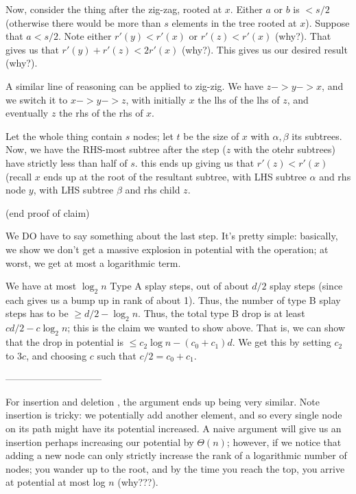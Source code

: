 \documentclass{article}
\begin{document}
Now, consider the thing after the zig-zag, rooted at $x$.
Either $a$ or $b$ is $< s/2$ (otherwise there would be more than $s$
elements in the tree rooted at $x$).
Suppose that $a < s / 2$.
Note either $r'(y) < r'(x)$ or $r'(z) < r'(x)$ (why?).
That gives us that $r'(y) + r'(z) < 2r'(x)$ (why?).
This gives us our desired result (why?).

A similar line of reasoning can be applied to zig-zig.
We have $z->y->x$, and we switch it to $x->y->z$, with initially
$x$ the lhs of the lhs of $z$, and eventually $z$ the rhs of the rhs of $x$.

Let the whole thing contain $s$ nodes; let $t$ be the size of $x$ with $\alpha,\beta$ its subtrees.
Now, we have the RHS-most subtree after the step ($z$ with the otehr subtrees)
have strictly less than half of $s$.
this ends up giving us that $r'(z) < r'(x)$ (recall $x$ ends up at
the root of the resultant subtree, with LHS subtree $\alpha$ and
rhs node $y$, with LHS subtree $\beta$ and rhs child $z$.


(end proof of claim)

We DO have to say something about the last step.
It's pretty simple: basically, we show we don't get a massive explosion in
potential with the operation; at worst, we get at most a logarithmic term.


We have at most $\log_2 n$ Type A splay steps, out of about $d/2$ splay
steps (since each gives us a bump up in rank of about 1).
Thus, the number of type B splay steps has to be $\geq d/2 - \log_2 n$.
Thus, the total type B drop is at least $cd/2 - c\log_2 n$; this is the claim
we wanted to show above. That is, we can show that
the drop in potential is $\leq c_2 \log n - (c_0 + c_1) d$.
We get this by setting $c_2$ to $3c$, and choosing $c$ such that
$c/2 = c_0 + c_1$.


------------------------------

For insertion and deletion , the argument ends up being very similar.
Note insertion is tricky: we potentially add another element, and so
every single node on its path might have its potential increased.
A naive argument will give us an insertion perhaps increasing our potential
by $\Theta(n)$; however, if we notice that adding a new node can only
strictly increase the rank of a logarithmic number of nodes;
you wander up to the root, and by the time you reach the top, you
arrive at potential at most log $n$ (why???).
\end{document}
